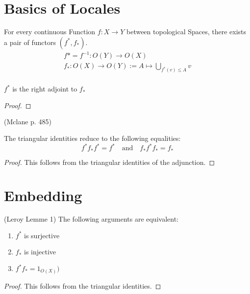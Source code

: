 
\section{Basics of Locales}

\begin{definition}[$f^*$ and $f_*$]
    \label{def:f_star}
    \leanok
    For every continuous Function $f : X \rightarrow Y$ between topological Spaces, there exists a pair of functors $(f^*,f_*)$.
    \begin{gather*}
        f* = f^{-1} : O(Y) \rightarrow O(X)\\
        f_* : O(X) \rightarrow O(Y) := A \mapsto \bigcup_{f^*(v) \le A} v\\
    \end{gather*}
\end{definition}



\begin{lemma}[$f^* \dashv f_*$]
    \label{lem:f_star_adj}
    \leanok
    $f^*$ is the right adjoint to $f_*$
\end{lemma}
\begin{proof}
    \leanok
\end{proof}

\begin{lemma}[triangle]
(Mclane p. 485)

    The triangular identities reduce to the following equalities:
    \[f^*f_*f^* = f^* \quad \text{and} \quad f_*f^*f_* = f_*\]
    \leanok
    \label{lem:triangle}
\end{lemma}
\begin{proof}
    This follows from the triangular identities of the adjunction.
    \leanok
\end{proof}


\section{Embedding}
\begin{lemma}[Embedding]
(Leroy Lemme 1)
    \label{lem:embedding}
    \leanok
    The following arguments are equivalent:
    \begin{enumerate}
        \item $f^*$ is surjective
        \item $f_*$ is injective
        \item $f^{*}f_* = 1_{O(X)})$
    \end{enumerate}
\end{lemma}
\begin{proof}
    This follows from the triangular identities. \leanok
\end{proof}

